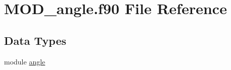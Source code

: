 \hypertarget{MOD__angle_8f90}{\section{M\-O\-D\-\_\-angle.\-f90 File Reference}
\label{MOD__angle_8f90}
}
\subsection*{Data Types}
\begin{DoxyCompactItemize}
\item 
module \hyperlink{classangle}{angle}
\end{DoxyCompactItemize}
